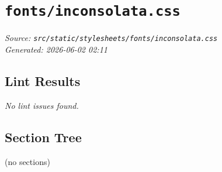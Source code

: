 
\section{\texttt{fonts/inconsolata.css}}
\textit{Source: \texttt{src/static/stylesheets/fonts/inconsolata.css}} \\
\textit{Generated: 2026-06-02 02:11} \\

\subsection{Lint Results}
\textit{No lint issues found.} \\

\subsection{Section Tree}
\begingroup
\linespread{0.9}\selectfont
\begin{verbnobox}[\FiraCode]
(no sections)
\end{verbnobox}
\endgroup
